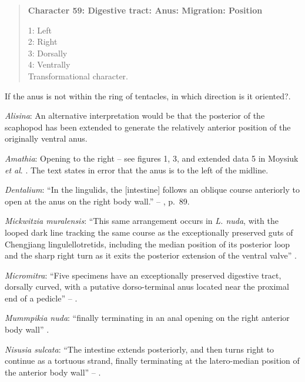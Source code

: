 \documentclass[openany]{book}
\theoremstyle{definition}
\theoremstyle{definition}
\theoremstyle{definition}
\theoremstyle{remark}
\begin{document}
\begin{quote}
\textbf{Character 59: Digestive tract: Anus: Migration: Position}

1: Left\\
2: Right\\
3: Dorsally\\
4: Ventrally\\
Transformational character.
\end{quote}

If the anus is not within the ring of tentacles, in which direction is
it oriented?.

\hypertarget{Alisina-coding-59}{}
\emph{Alisina}: An alternative interpretation would be that the
posterior of the scaphopod has been extended to generate the relatively
anterior position of the originally ventral anus.

\hypertarget{Amathia-coding-59}{}
\emph{Amathia}: Opening to the right -- see figures 1, 3, and extended
data 5 in Moysiuk \emph{et al}. \citeyearpar{Moysiuk2017Hyolithsare}.
The text states in error that the anus is to the left of the midline.

\hypertarget{Dentalium-coding-59}{}
\emph{Dentalium}: ``In the lingulids, the {[}intestine{]} follows an
oblique course anteriorly to open at the anus on the right body wall.''
-- \citet{Williams1997Introduction}, p.~89.

\hypertarget{Mickwitzia_muralensis-coding-59}{}
\emph{Mickwitzia muralensis}: ``This same arrangement occurs in \emph{L.
nuda}, with the looped dark line tracking the same course as the
exceptionally preserved guts of Chengjiang lingulellotretids, including
the median position of its posterior loop and the sharp right turn as it
exits the posterior extension of the ventral valve''
\citep[p.310]{Balthasar2009EarlyCambrian}.

\hypertarget{Micromitra-coding-59}{}
\emph{Micromitra}: ``Five specimens have an exceptionally preserved
digestive tract, dorsally curved, with a putative dorso-terminal anus
located near the proximal end of a pedicle'' --
\citet{Zhang2007Rhynchonelliformeanbrachiopods}.

\hypertarget{Mummpikia_nuda-coding-59}{}
\emph{Mummpikia nuda}: ``finally terminating in an anal opening on the
right anterior body wall'' \citep[p.66]{Zhang2007Noteon}.

\hypertarget{Nisusia_sulcata-coding-59}{}
\emph{Nisusia sulcata}: ``The intestine extends posteriorly, and then
turns right to continue as a tortuous strand, finally terminating at the
latero-median position of the anterior body wall'' --
\citet{Zhang2007Agregarious}.
\end{document}
